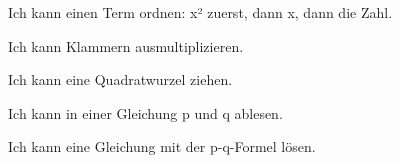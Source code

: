 \documentclass[11pt]{article}
\begin{document}
\setcounter{aufgabe}{0}


\begin{kbaufgabe}{Ich kann einen Term ordnen: x² zuerst, dann x, dann die Zahl.}
\begin{kbblock}
\kbantwort{\kbfeld}
\end{kbblock}
\end{kbaufgabe}

\begin{kbaufgabe}{Ich kann Klammern ausmultiplizieren.}
\begin{kbblock}
\kbantwort{\kbfeld}
\end{kbblock}
\end{kbaufgabe}

\begin{kbaufgabe}{Ich kann eine Quadratwurzel ziehen.}
\begin{kbblock}
\kbantwort{\kbfeld}
\end{kbblock}
\end{kbaufgabe}


\begin{kbaufgabe}{Ich kann in einer Gleichung p und q ablesen.}
\begin{kbblock}
\end{kbblock}
\end{kbaufgabe}

\begin{kbaufgabe}{Ich kann eine Gleichung mit der p-q-Formel lösen.}
\begin{kbblock}
\end{kbblock}
\end{kbaufgabe}
\end{document}
